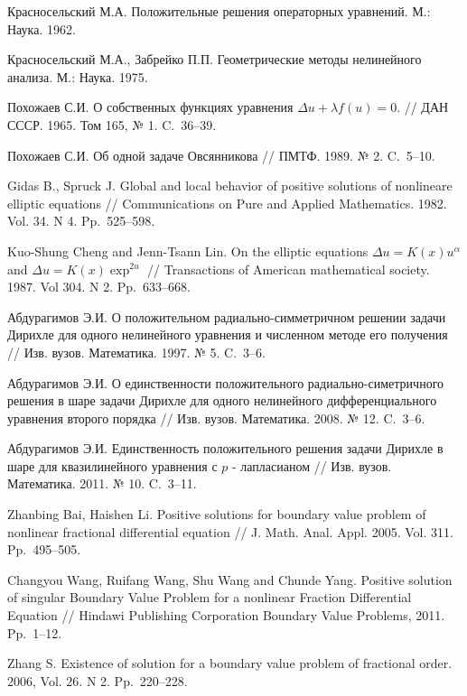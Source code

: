 \begin{thebibliography}{1}
{Красносельский М.А.} Положительные решения операторных уравнений. М.: Наука. 1962.

{Красносельский М.А., Забрейко П.П.} Геометрические методы нелинейного анализа.   М.: Наука. 1975.

{Похожаев С.И.} О собственных функциях уравнения $\Delta u+\lambda f(u)=0.$ // ДАН СССР. 1965. Том 165, № 1.  C.~36--39.

 {Похожаев С.И.} Об одной задаче Овсянникова // ПМТФ. 1989. № 2. C.~5--10.

 {Gidas B., Spruck  J.} Global and local behavior of positive solutions
of nonlineare elliptic equations // Communications on Pure and
Applied Mathematics.  1982. Vol. 34. N 4. Pp.~525--598.

{Kuo-Shung Cheng and Jenn-Tsann Lin.} On the elliptic equations
$ \Delta u=K(x)u^{\alpha} $   and $ \Delta u=K(x)\exp^{2u} $ // Transactions of American mathematical society. 1987. Vol 304. N 2. Pp.~633--668.

{Абдурагимов Э.И.} О положительном радиально-симметричном
решении задачи Дирихле для одного нелинейного уравнения и
численном методе его получения // Изв. вузов. Математика. 1997. № 5. C.~3--6.

{Абдурагимов Э.И.} О единственности положительного
радиально-симетричного решения в шаре
 задачи Дирихле для одного нелинейного дифференциального уравнения
 второго порядка // Изв. вузов. Математика. 2008. № 12. C.~3--6.

{Абдурагимов Э.И.} Единственность положительного решения задачи Дирихле в шаре для
квазилинейного уравнения с  $p$ - лапласианом // Изв. вузов. Математика. 2011. № 10. C.~3--11.

{Zhanbing Bai, Haishen Li.} Positive solutions for boundary value
problem of nonlinear fractional differential equation // J. Math. Anal. Appl. 2005. Vol. 311. Pp.~495--505.

{Changyou Wang, Ruifang Wang, Shu Wang and Chunde Yang.} Positive
solution of singular Boundary Value Problem for a nonlinear Fraction
Differential Equation // Hindawi Publishing Corporation Boundary
Value Problems, 2011. Pp.~1--12.

{Zhang S.} Existence of solution for a boundary value problem of
fractional order.  2006, Vol. 26. N 2. Pp.~220--228.


\end{thebibliography}
